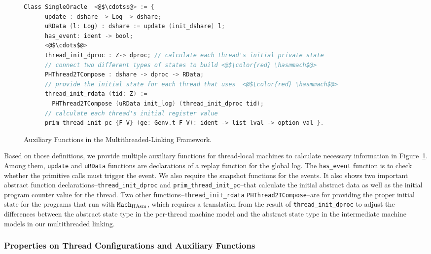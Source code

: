 \begin{figure}
\begin{lstlisting}[language=C, morekeywords={Class}]
  Class SingleOracle  <@$\cdots$@> := {
      update : dshare -> Log -> dshare;
      uRData (l: Log) : dshare := update (init_dshare) l;
      has_event: ident -> bool;      
      <@$\cdots$@>
      thread_init_dproc : Z-> dproc; // calculate each thread's initial private state
      // connect two different types of states to build <@$\color{red} \hasmmach$@>
      PHThread2TCompose : dshare -> dproc -> RData; 
      // provide the initial state for each thread that uses  <@$\color{red} \hasmmach$@>
      thread_init_rdata (tid: Z) :=
        PHThread2TCompose (uRData init_log) (thread_init_dproc tid);
      // calculate each thread's initial register value
      prim_thread_init_pc {F V} (ge: Genv.t F V): ident -> list lval -> option val }.
\end{lstlisting}
\caption{Auxiliary Functions in the Multithreaded-Linking Framework.}
\label{fig:chapter:conlink:multithreaded-linking-aux-functions}
\end{figure}

Based on those definitions, we provide multiple auxiliary functions 
for thread-local machines to calculate necessary information in Figure~\ref{fig:chapter:conlink:multithreaded-linking-aux-functions}.
Among them,  \lstinline$update$ and \lstinline$uRData$ functions are  declarations of a replay function for the global log. 
The \lstinline$has_event$ function is to check whether the primitive calls must trigger the event.
We also require the snapshot functions for the events.
It also shows two important abstract function declarations--\lstinline$thread_init_dproc$ and \lstinline$prim_thread_init_pc$--that calculate the initial abstract data as well as the initial program counter value for the thread. 
Two other functions--\lstinline$thread_init_rdata$ \lstinline$PHThread2TCompose$--are for providing the proper initial state for the programs that run with ${\mathrm{\texttt{Mach}}}_{\mathrm{HAsm}}$, 
which requires a translation from the result of \lstinline$thread_init_dproc$   to adjust the differences between
the abstract state type in the per-thread machine model and the abstract state type in the
intermediate machine models in our multithreaded linking. 

\subsubsection{Properties on Thread Configurations and Auxiliary Functions}


